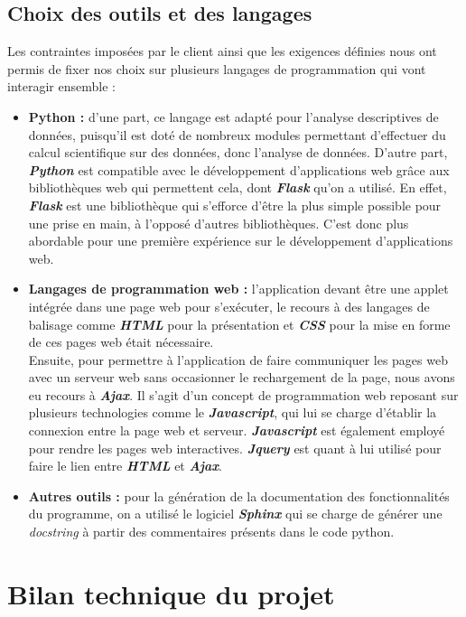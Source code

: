 		\subsection{Choix des outils et des langages}
		Les contraintes imposées par le client ainsi que les exigences définies nous ont permis de fixer nos choix sur plusieurs langages de programmation qui vont interagir ensemble : 
		\begin{itemize}[leftmargin=*]
			\item \textbf{Python :} d'une part, ce langage est adapté pour l'analyse descriptives de données, puisqu'il est doté de nombreux modules permettant d'effectuer du calcul scientifique sur des données, donc l'analyse de données. D'autre part, \textbf{\textit{Python}} est compatible avec le développement d’applications web grâce aux bibliothèques web qui permettent cela, dont \textbf{\textit{Flask}} qu'on a utilisé. En effet, \textbf{\textit{Flask}} est une bibliothèque qui s’efforce d’être la plus simple possible pour une prise en main, à l'opposé d'autres bibliothèques. C'est donc plus abordable pour une première expérience sur le développement d'applications web.
			\item \textbf{Langages de programmation web :} l'application devant être une applet intégrée dans une page web pour s'exécuter, le recours à des langages de balisage comme \textbf{\textit{HTML}} pour la présentation et \textbf{\textit{CSS}} pour la mise en forme de ces pages web était nécessaire.\\
			Ensuite, pour permettre à l'application de faire communiquer les pages web avec un serveur web sans occasionner le rechargement de la page, nous avons eu recours à \textbf{\textit{Ajax}}. Il s'agit d'un concept de programmation web reposant sur plusieurs technologies comme le \textbf{\textit{Javascript}}, qui lui se charge d'établir la connexion entre la page web et serveur. \textbf{\textit{Javascript}} est également employé pour rendre les pages web interactives. \textbf{\textit{Jquery}} est quant à lui utilisé pour faire le lien entre \textbf{\textit{HTML}} et \textbf{\textit{Ajax}}.
			\item \textbf{Autres outils :} pour la génération de la documentation des fonctionnalités du programme, on a utilisé le logiciel \textbf{\textit{Sphinx}} qui se charge de générer une \textit{docstring} à partir des commentaires présents dans le code python.
		\end{itemize}
		
	\section{Bilan technique du projet}
